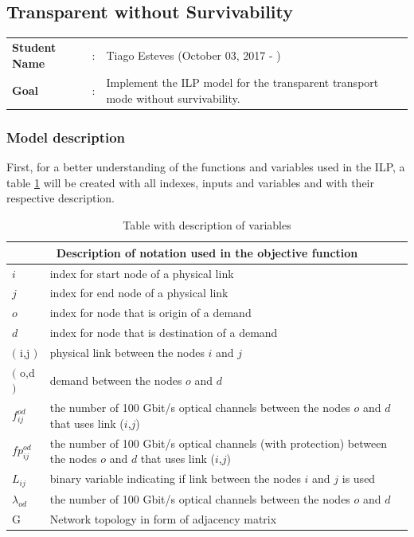 \clearpage

\subsection{Transparent without Survivability}\label{ILP_Transp_Survivability}
\begin{tcolorbox}	
\begin{tabular}{p{2.75cm} p{0.2cm} p{10.5cm}} 	
\textbf{Student Name}  &:& Tiago Esteves    (October 03, 2017 - )\\
\textbf{Goal}          &:& Implement the ILP model for the transparent transport mode without survivability.
\end{tabular}
\end{tcolorbox}

\subsubsection{Model description}

First, for a better understanding of the functions and variables used in the ILP, a table \ref{description_transp} will be created with all indexes, inputs and variables and with their respective description.\\

\begin{table}[h!]
\centering
\begin{tabular}{ |p{1cm}||p{13cm}|}
 \hline
 \multicolumn{2}{|c|}{Description of notation used in the objective function} \\
 \hline
 \hline
 $i$ & index for start node of a physical link \\
 $j$ & index for end node of a physical link \\
 $o$ & index for node that is origin of a demand \\
 $d$ & index for node that is destination of a demand \\
 $($ i,j $)$ & physical link between the nodes $i$ and $j$ \\
 $($ o,d $)$ & demand between the nodes $o$ and $d$ \\
 $f_{ij}^{od}$ & the number of 100 Gbit/s optical channels between the nodes $o$ and $d$ that uses link ($i$,$j$) \\
 $fp_{ij}^{od}$ & the number of 100 Gbit/s optical channels (with protection) between the nodes $o$ and $d$ that uses link ($i$,$j$) \\
 $L_{ij}$ & binary variable indicating if link between the nodes $i$ and $j$ is used \\
 $\lambda_{od}$ & the number of 100 Gbit/s optical channels between the nodes $o$ and $d$ \\
 G & Network topology in form of adjacency matrix \\
 \hline
\end{tabular}
\caption{Table with description of variables}
\label{description_transp}
\end{table}

